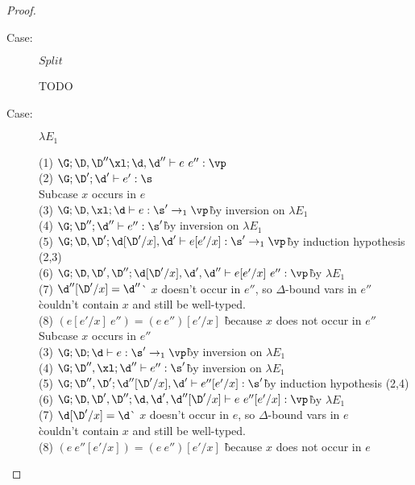 \begin{proof}
\begin{description}
\item[Case:] $Split$
\begin{tabbing}
    TODO
\end{tabbing}

\item[Case:] $\lambda E_1$
\begin{tabbing}
  (1) $\G; \D,\D'' \xl; \d,\d'' \vdash e~e'' : \vp$\\
  (2) $\G; \D'; \d' \vdash e' : \s$\\
  Subcase $x$ occurs in $e$\\
  (3) $\G; \D,\xl;\d \vdash e : \s' \to_1 \vp$\` by inversion on $\lambda E_1$\\
  (4) $\G; \D'';\d'' \vdash e'' : \s'$\` by inversion on $\lambda E_1$\\
  (5) $\G; \D, \D'; \d[\D'/x],\d' \vdash e[e'/x] : \s' \to_1 \vp$\` by induction hypothesis (2,3)\\
  (6) $\G; \D, \D', \D''; \d[\D'/x], \d', \d'' \vdash e[e'/x]~e'' : \vp$\` by $\lambda E_1$\\
  (7) $\d''[\D'/x] = \d''$\` $x$ doesn't occur in $e''$, so $\Delta$-bound vars in $e''$ \\
      \` couldn't contain $x$ and still be well-typed.\\
  (8) $(e[e'/x]~e'') = (e~e'')[e'/x]$ \` because $x$ does not occur in $e''$\\
  Subcase $x$ occurs in $e''$\\
  (3) $\G; \D;\d \vdash e : \s' \to_1 \vp$\` by inversion on $\lambda E_1$\\
  (4) $\G; \D'', \xl;\d'' \vdash e'' : \s'$\` by inversion on $\lambda E_1$\\
  (5) $\G; \D'',\D';\d''[\D'/x], \d' \vdash e''[e'/x] : \s'$\` by induction hypothesis (2,4)\\
  (6) $\G; \D,\D',\D''; \d,\d',\d''[\D'/x] \vdash e~e''[e'/x] : \vp$\` by $\lambda E_1$\\
  (7) $\d[\D'/x] = \d$\` $x$ doesn't occur in $e$, so $\Delta$-bound vars in $e$ \\
      \` couldn't contain $x$ and still be well-typed.\\
  (8) $(e~e''[e'/x]) = (e~e'')[e'/x]$ \` because $x$ does not occur in $e$\\
\end{tabbing}


\end{description}
\end{proof}
